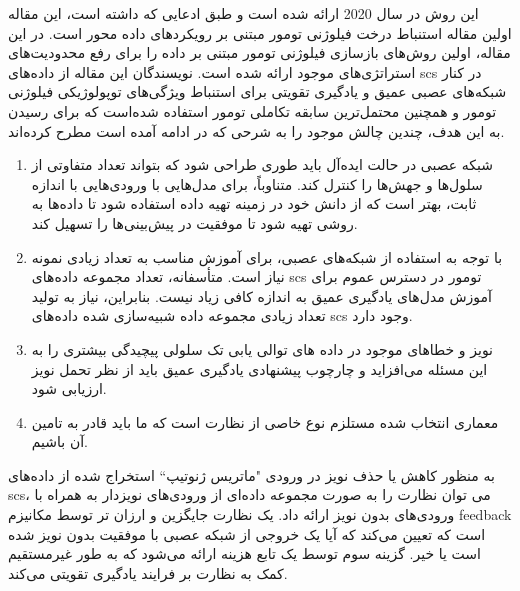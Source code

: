این روش در سال 2020 ارائه شده است و طبق ادعایی که داشته است، این مقاله اولین مقاله استنباط درخت فیلوژنی تومور مبتنی بر رویکردهای داده محور است. در این مقاله، اولین روش‌های بازسازی فیلوژنی تومور مبتنی بر داده را برای رفع محدودیت‌های استراتژی‌های موجود ارائه شده است. نویسندگان این مقاله از داده‌های \gls{scs} در کنار شبکه‌های عصبی عمیق و یادگیری تقویتی برای استنباط ویژگی‌های توپولوژیکی فیلوژنی تومور و همچنین محتمل‌ترین سابقه تکاملی تومور استفاده شده‌است که برای رسیدن به این هدف، چندین چالش موجود را به شرحی که در ادامه آمده است مطرح کرده‌اند. 
\begin{enumerate}
	\item     شبکه عصبی در حالت ایده‌آل باید طوری طراحی شود که بتواند تعداد متفاوتی از سلول‌ها و جهش‌ها را کنترل کند.  متناوباً، برای مدل‌هایی با ورودی‌هایی با اندازه ثابت‌، بهتر است که از دانش خود در زمینه تهیه داده استفاده شود تا داده‌ها به روشی تهیه شود تا موفقیت در پیش‌بینی‌ها را تسهیل کند. 
	\item با توجه به استفاده از شبکه‌های عصبی، برای آموزش مناسب به تعداد زیادی نمونه نیاز است. متأسفانه، تعداد مجموعه داده‌های \gls{scs} تومور در دسترس عموم برای آموزش مدل‌های یادگیری عمیق به اندازه کافی زیاد نیست. بنابراین، نیاز به تولید تعداد زیادی مجموعه داده شبیه‌سازی شده داده‌های \gls{scs} وجود دارد.  
	\item نویز و خطاهای موجود در داده های توالی یابی تک سلولی پیچیدگی بیشتری را به این مسئله می‌افزاید و چارچوب پیشنهادی یادگیری عمیق باید از نظر تحمل نویز  ارزیابی شود.  
	\item معماری انتخاب شده مستلزم نوع خاصی از نظارت است که ما باید قادر به تامین آن باشیم.
\end{enumerate}
به منظور کاهش یا حذف نویز در ورودی "ماتریس ژنوتیپ`` استخراج شده از داده‌های \gls{scs}، می توان نظارت را به صورت مجموعه داده‌ای از ورودی‌های نویزدار به همراه با ورودی‌های بدون نویز ارائه داد. یک نظارت جایگزین و ارزان تر توسط مکانیزم \gls{feedback} است که تعیین می‌کند که آیا  یک خروجی  از شبکه عصبی با موفقیت بدون نویز شده است یا خیر. گزینه سوم توسط یک تابع هزینه ارائه می‌شود که به طور غیرمستقیم کمک به نظارت بر فرایند یادگیری تقویتی می‌کند. 

